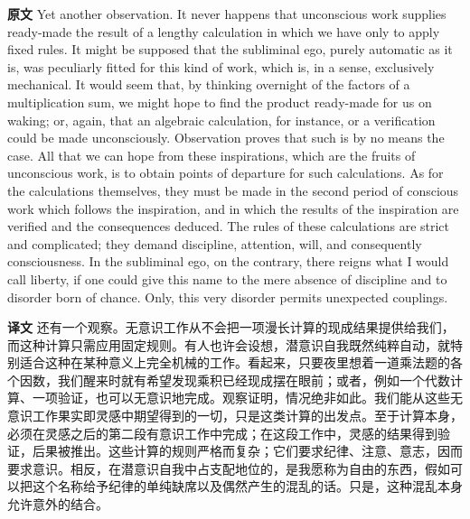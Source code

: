 \documentclass[UTF8,zihao=-4]{ctexart}
\newcommand{\BodyFont}{\fontsize{10.5pt}{15.5pt}\selectfont}
\newcommand{\origlabel}{\textbf{原文}\quad}
\newcommand{\translabel}{\textbf{译文}\quad}
\newenvironment{enblock}{\par\noindent\begingroup\BodyFont\origlabel}{\par\endgroup}
\newenvironment{zhblock}{\par\noindent\begingroup\BodyFont\translabel}{\par\endgroup\vspace{0.35em}}
\begin{document}
\begin{enblock}
Yet another observation. It never happens that unconscious work supplies ready-made the result of a lengthy calculation in which we have only to apply fixed rules. It might be supposed that the subliminal ego, purely automatic as it is, was peculiarly fitted for this kind of work, which is, in a sense, exclusively mechanical. It would seem that, by thinking overnight of the factors of a multiplication sum, we might hope to find the product ready-made for us on waking; or, again, that an algebraic calculation, for instance, or a verification could be made unconsciously. Observation proves that such is by no means the case. All that we can hope from these inspirations, which are the fruits of unconscious work, is to obtain points of departure for such calculations. As for the calculations themselves, they must be made in the second period of conscious work which follows the inspiration, and in which the results of the inspiration are verified and the consequences deduced. The rules of these calculations are strict and complicated; they demand discipline, attention, will, and consequently consciousness. In the subliminal ego, on the contrary, there reigns what I would call liberty, if one could give this name to the mere absence of discipline and to disorder born of chance. Only, this very disorder permits unexpected couplings.
\end{enblock}
\begin{zhblock}
还有一个观察。无意识工作从不会把一项漫长计算的现成结果提供给我们，而这种计算只需应用固定规则。有人也许会设想，潜意识自我既然纯粹自动，就特别适合这种在某种意义上完全机械的工作。看起来，只要夜里想着一道乘法题的各个因数，我们醒来时就有希望发现乘积已经现成摆在眼前；或者，例如一个代数计算、一项验证，也可以无意识地完成。观察证明，情况绝非如此。我们能从这些无意识工作果实即灵感中期望得到的一切，只是这类计算的出发点。至于计算本身，必须在灵感之后的第二段有意识工作中完成；在这段工作中，灵感的结果得到验证，后果被推出。这些计算的规则严格而复杂；它们要求纪律、注意、意志，因而要求意识。相反，在潜意识自我中占支配地位的，是我愿称为自由的东西，假如可以把这个名称给予纪律的单纯缺席以及偶然产生的混乱的话。只是，这种混乱本身允许意外的结合。\end{zhblock}
\end{document}
